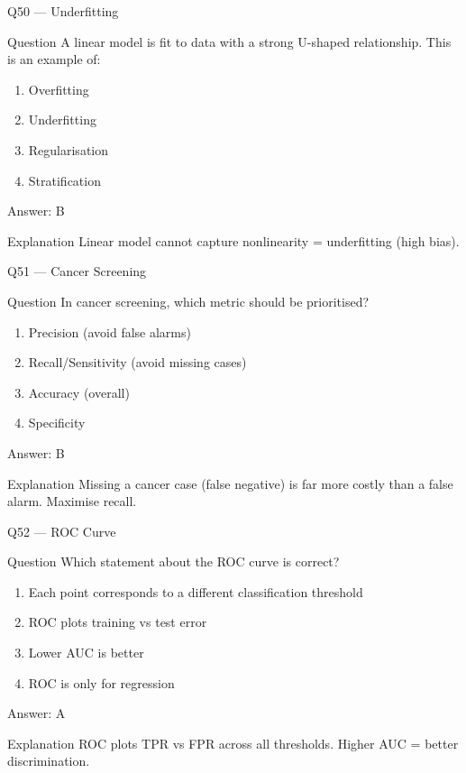 \documentclass[aspectratio=169,8pt]{beamer}
\begin{document}
	\begin{frame}{Q50 --- Underfitting}
		\begin{block}{Question}
			A linear model is fit to data with a strong U-shaped relationship. This is an example of:
		\end{block}
		\begin{enumerate}
			\item Overfitting
			\item Underfitting
			\item Regularisation
			\item Stratification
		\end{enumerate}
		\begin{exampleblock}{Answer: B}\end{exampleblock}
		\begin{block}{Explanation}
			Linear model cannot capture nonlinearity = underfitting (high bias).
		\end{block}
	\end{frame}
	
	\begin{frame}{Q51 --- Cancer Screening}
		\begin{block}{Question}
			In cancer screening, which metric should be prioritised?
		\end{block}
		\begin{enumerate}
			\item Precision (avoid false alarms)
			\item Recall/Sensitivity (avoid missing cases)
			\item Accuracy (overall)
			\item Specificity
		\end{enumerate}
		\begin{exampleblock}{Answer: B}\end{exampleblock}
		\begin{block}{Explanation}
			Missing a cancer case (false negative) is far more costly than a false alarm. Maximise recall.
		\end{block}
	\end{frame}
	
	\begin{frame}{Q52 --- ROC Curve}
		\begin{block}{Question}
			Which statement about the ROC curve is correct?
		\end{block}
		\begin{enumerate}
			\item Each point corresponds to a different classification threshold
			\item ROC plots training vs test error
			\item Lower AUC is better
			\item ROC is only for regression
		\end{enumerate}
		\begin{exampleblock}{Answer: A}\end{exampleblock}
		\begin{block}{Explanation}
			ROC plots TPR vs FPR across all thresholds. Higher AUC = better discrimination.
		\end{block}
	\end{frame}
	
\end{document}

